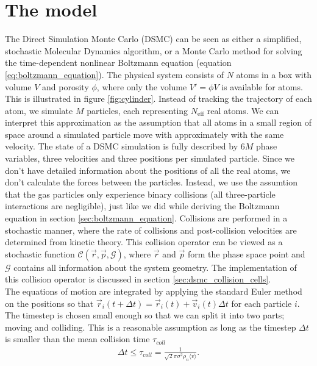 \section{The model}
\label{sec:dsmc_model}
The Direct Simulation Monte Carlo (DSMC) can be seen as either a simplified, stochastic Molecular Dynamics algorithm, or a Monte Carlo method for solving the time-dependent nonlinear Boltzmann equation (equation \eqref{eq:boltzmann_equation}). The physical system consists of $N$ atoms in a box with volume $V$ and porosity $\phi$, where only the volume $V' = \phi V$ is available for atoms. This is illustrated in figure \ref{fig:cylinder}.
Instead of tracking the trajectory of each atom, we simulate $M$ particles, each representing $N_\text{eff}$ real atoms. We can interpret this approximation as the assumption that all atoms in a small region of space around a simulated particle move with approximately with the same velocity. The state of a DSMC simulation is fully described by $6M$ phase variables, three velocities and three positions per simulated particle. Since we don't have detailed information about the positions of all the real atoms, we don't calculate the forces between the particles. Instead, we use the assumtion that the gas particles only experience binary collisions (all three-particle interactions are negligible), just like we did while deriving the Boltzmann equation in section \ref{sec:boltzmann_equation}. Collisions are performed in a stochastic manner, where the rate of collisions and post-collision velocities are determined from kinetic theory. This collision operator can be viewed as a stochastic function $\mathcal{C}(\vec r, \vec p, \mathcal{G})$, where $\vec r$ and $\vec p$ form the phase space point and $\mathcal G$ contains all information about the system geometry. The implementation of this collision operator is discussed in section \ref{sec:dsmc_collision_cells}.\\
The equations of motion are integrated by applying the standard Euler method on the positions so that $\vec r_i(t+\Delta t) = \vec r_i(t) + \vec v_i(t)\Delta t$ for each particle $i$. The timestep is chosen small enough so that we can split it into two parts; moving and colliding. This is a reasonable assumption as long as the timestep $\Delta t$ is smaller than the mean collision time $\tau_{coll}$ 
\begin{align}
	\Delta t \leq \tau_{coll} = \frac{1}{\sqrt 2 \pi \sigma^2 \rho_n \langle v \rangle}.
\end{align}
